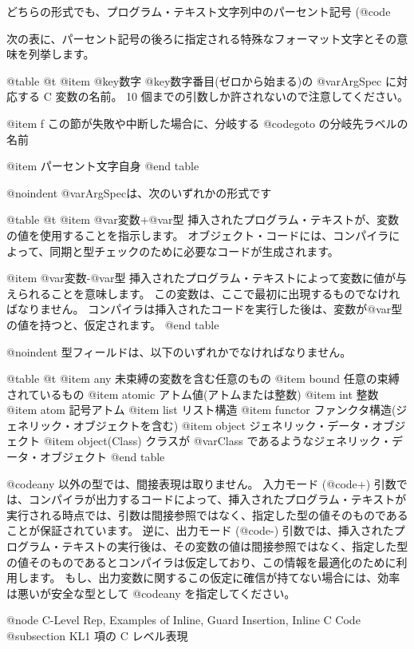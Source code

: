 どちらの形式でも、プログラム・テキスト文字列中のパーセント記号 (@code{%
次の表に、パーセント記号の後ろに指定される特殊なフォーマット文字とその意味を列挙します。

@table @t
@item @key{数字}
@key{数字}番目(ゼロから始まる)の @var{ArgSpec} に対応する C 変数の名前。
10 個までの引数しか許されないので注意してください。

@item f
この節が失敗や中断した場合に、分岐する @code{goto} の分岐先ラベルの名前

@item %
パーセント文字自身
@end table 

@noindent
@var{ArgSpec}は、次のいずれかの形式です

@table @t
@item @var{変数}+@var{型}
挿入されたプログラム・テキストが、変数の値を使用することを指示します。
オブジェクト・コードには、コンパイラによって、同期と型チェックのために必要なコードが生成されます。

@item @var{変数}-@var{型}
挿入されたプログラム・テキストによって変数に値が与えられることを意味します。
この変数は、ここで最初に出現するものでなければなりません。
コンパイラは挿入されたコードを実行した後は、変数が@var{型}の値を持つと、仮定されます。
@end table

@noindent
型フィールドは、以下のいずれかでなければなりません。

@table @t
@item any
未束縛の変数を含む任意のもの
@item bound
任意の束縛されているもの
@item atomic
アトム値(アトムまたは整数)
@item int
整数
@item atom
記号アトム
@item list
リスト構造
@item functor
ファンクタ構造(ジェネリック・オブジェクトを含む)
@item object
ジェネリック・データ・オブジェクト
@item object(Class)
クラスが @var{Class} であるようなジェネリック・データ・オブジェクト
@end table

@code{any} 以外の型では、間接表現は取りません。
入力モード (@code{+}) 引数では、コンパイラが出力するコードによって、挿入されたプログラム・テキストが実行される時点では、引数は間接参照ではなく、指定した型の値そのものであることが保証されています。
逆に、出力モード (@code{-}) 引数では、挿入されたプログラム・テキストの実行後は、その変数の値は間接参照ではなく、指定した型の値そのものであるとコンパイラは仮定しており、この情報を最適化のために利用します。
もし、出力変数に関するこの仮定に確信が持てない場合には、効率は悪いが安全な型として @code{any} を指定してください。

@node C-Level Rep, Examples of Inline, Guard Insertion, Inline C Code
@subsection KL1 項の C レベル表現

}
